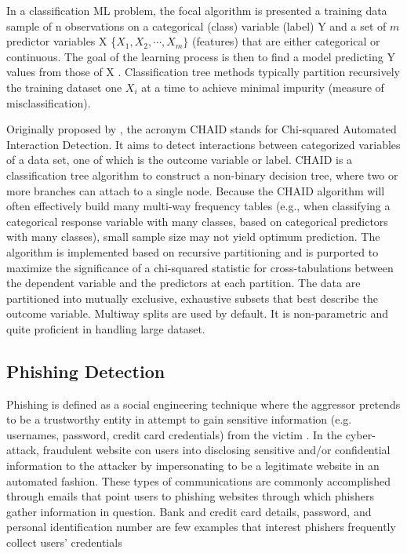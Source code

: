 \documentclass[deca,nonblindrev]{informs3} %
\begin{document}
In a classification ML problem, the focal algorithm  is  presented  a training data sample of n observations on a categorical (class) variable (label) Y and a set of $m$ predictor variables X \{$X_1, X_2, \cdots, X_m\}$  (features) that are either categorical or continuous. The goal of the learning process is then  to find a model predicting Y values from those of X \citep{Loh2011}. Classification tree methods typically partition recursively the training dataset one $X_i$ at a time to achieve minimal  impurity (measure of misclassification). 

Originally proposed by \cite{kass1980exploratory}, the acronym CHAID stands for Chi-squared Automated Interaction Detection. It aims to detect interactions between categorized variables of a data set, one of which is the outcome variable or label. CHAID is a classification tree algorithm to construct a non-binary decision tree, where two or more branches can attach to a single node.  Because the CHAID algorithm will often effectively build many multi-way frequency tables (e.g., when classifying a categorical response variable with many classes, based on categorical predictors with many classes), small sample size may not yield optimum prediction. The algorithm is implemented based on recursive partitioning and is purported to maximize the significance of a chi-squared statistic for cross-tabulations between the dependent variable and the predictors at each partition. The data are partitioned into mutually exclusive, exhaustive subsets that best describe the outcome variable. Multiway splits are used by default.  It is non-parametric and  quite proficient in handling large dataset.
 
\subsection{Phishing Detection}
Phishing is defined as a social engineering technique where the aggressor pretends to be a trustworthy entity in attempt to gain sensitive information (e.g. usernames, password, credit card credentials) from the victim \citep{Jagatic2007}. In the cyber-attack, fraudulent website con users into disclosing sensitive and/or confidential information to the attacker by impersonating to be a legitimate website in an automated fashion.  These types of communications are commonly accomplished through emails that point users to phishing websites through which phishers gather information in question.  Bank and credit card details, password, and personal identification number are few examples that interest phishers frequently collect users’ credentials \citep{jakobsson2006phishing}
\end{document}
